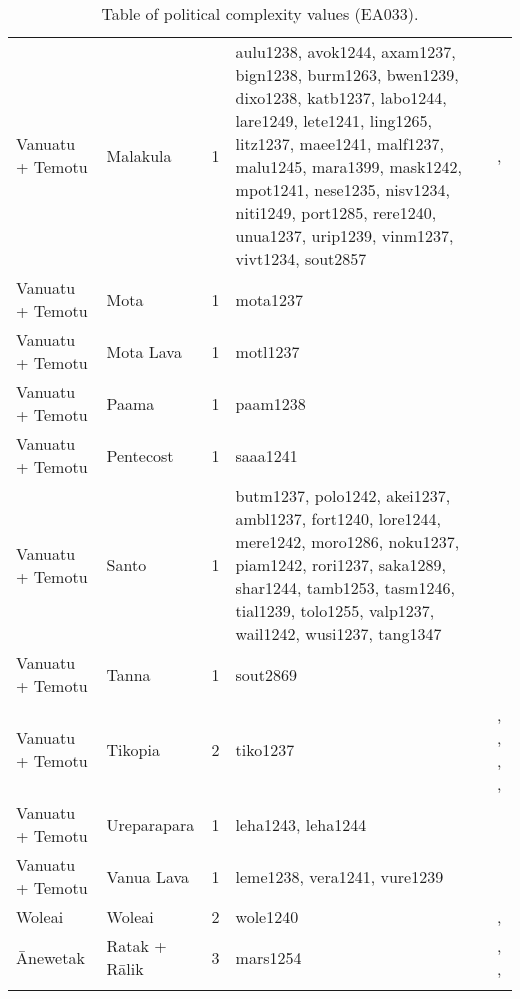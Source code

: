 \begin{longtable}{p{4.5cm}p{2cm}p{2cm}p{4cm}p{4cm}}
  Vanuatu + Temotu & Malakula & 1 & aulu1238, avok1244, axam1237, bign1238, burm1263, bwen1239, dixo1238, katb1237, labo1244, lare1249, lete1241, ling1265, litz1237, maee1241, malf1237, malu1245, mara1399, mask1242, mpot1241, nese1235, nisv1234, niti1249, port1285, rere1240, unua1237, urip1239, vinm1237, vivt1234, sout2857 & \citet{bonnemaison1996power}, \citet{deacon1934} \\ 
  Vanuatu + Temotu & Mota & 1 & mota1237 & \citet{bonnemaison1996power} \\ 
  Vanuatu + Temotu & Mota Lava & 1 & motl1237 & \citet{bonnemaison1996power} \\ 
  Vanuatu + Temotu & Paama & 1 & paam1238 & \citet{bonnemaison1996power} \\ 
  Vanuatu + Temotu & Pentecost & 1 & saaa1241 & \citet{lane1956} \\ 
  Vanuatu + Temotu & Santo & 1 & butm1237, polo1242, akei1237, ambl1237, fort1240, lore1244, mere1242, moro1286, noku1237, piam1242, rori1237, saka1289, shar1244, tamb1253, tasm1246, tial1239, tolo1255, valp1237, wail1242, wusi1237, tang1347 & \citet{bonnemaison1996power} \\ 
  Vanuatu + Temotu & Tanna & 1 & sout2869 & \citet{lindstroem1991} \\ 
  Vanuatu + Temotu & Tikopia & 2 & tiko1237 & \citet{kirch1994wet}, \citet{sahlins1958social}, \citet{firth1939primitive}, \citet{firth1959social}, \citet{firth1991} \\ 
  Vanuatu + Temotu & Ureparapara & 1 & leha1243, leha1244 & \citet{bonnemaison1996power} \\ 
  Vanuatu + Temotu & Vanua Lava & 1 & leme1238, vera1241, vure1239 & \citet{bonnemaison1996power} \\ 
  Woleai & Woleai & 2 & wole1240 & \citet{alkire1991woleai}, \citet{burrowsandspiro1953} \\ 
  Ānewetak & Ratak + Rālik & 3 & mars1254 & \citet{carruci1991marshall}, \citet{erdland1914}, \citet{williamson_1982} \\ 
   \bottomrule
\caption{Table of political complexity values (EA033).} 
\label{appendix_pol_complex_xtable}
\end{longtable}
